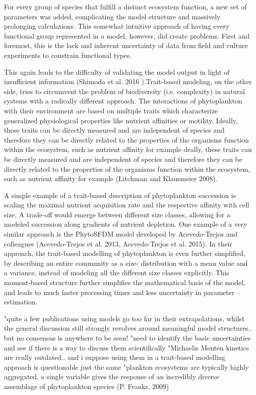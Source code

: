 For every group of species that fulfill a distinct ecosystem function, a new set of parameters was added, complicating the model structure and massively prolonging calculations. This somewhat intuitive approach of having every functional group represented in a model, however, did create problems. First and foremost, this is the lack and inherent uncertainty of data from field and culture experiments to constrain functional types. 

This again leads to the difficulty of validating the model output in light of insufficient information (Shimoda et al. 2016 ).Trait-based modeling, on the other side, tries to circumvent the problem of biodiversity (i.e. complexity) in natural systems with a radically different approach. The interactions of phytoplankton with their environment are based on multiple traits which characterize generalized physiological properties like nutrient affinities or motility. Ideally, these traits can be directly measured and are independent of species and therefore they can be directly related to the properties of the organisms function within the ecosystem, such as nutrient affinity for example deally, these traits can be directly measured and are independent of species and therefore they can be directly related to the properties of the organisms function within the ecosystem, such as nutrient affinity for example (Litchman and Klausmeier 2008).  


A simple example of a trait-based description of phytoplankton succession is scaling the maximal nutrient acquisition rate and the respective affinity with cell size. A trade-off would emerge between different size classes, allowing for a modeled succession along gradients of nutrient depletion. One example of a very similar approach is the PhytoSFDM model developed by Acevedo-Trejos and colleagues (Acevedo‐Trejos et al. 2013, Acevedo-Trejos et al. 2015). In their approach, the trait-based modelling of phytoplankton is even further simplified, by describing an entire community as a size- distribution with a mean value and a variance, instead of modeling all the different size classes explicitly. This moment-based structure further simplifies the mathematical basis of the model, and leads to much faster processing times and less uncertainty in parameter estimation.



"quite a few publications using models go too far in their extrapolations, whilst the general discussion still strongly revolves around meaningful model structures.. but no consensus is anywhere to be seen!
"need to identify the basic uncertainties and see if there is a way to discuss them scientifically
"Michaelis Menten kinetics are really outdated.. and i suppose using them in a trait-based modelling approach is questionable just the same
"plankton ecosystems are typically highly aggregated, a single variable gives the response of an incredibly diverse assemblage of phytoplankton species (P. Franks, 2009)


